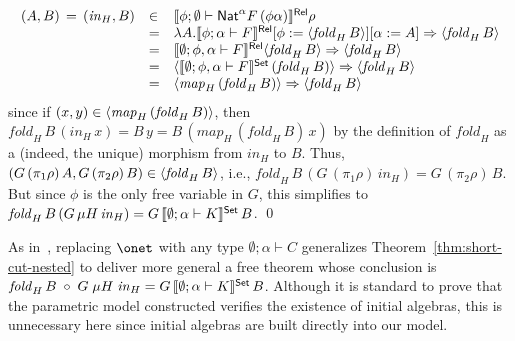 \documentclass{lmcs}
\theoremstyle{plain}\newtheorem{satz}[thm]{Satz}
\begin{document}
\[\begin{array}{lll}
(A,B) \,=\, (\mathit{in}_H,B) & \in & \llbracket{\phi;\emptyset\vdash
  \mathsf{Nat}^\alpha F\, (\phi\alpha)}\rrbracket^{\mathsf{Rel}}\rho\\
& = & \lambda A. \llbracket{\phi;\alpha\vdash F}\rrbracket^{\mathsf{Rel}}[\phi :=
  \langle {\mathit{fold}_H\, B} \rangle][\alpha := A] \Rightarrow 
 \langle {\mathit{fold}_H\, B} \rangle \\ 
& = & \llbracket{\emptyset;\phi,\alpha\vdash F}\rrbracket^{\mathsf{Rel}}
  \langle {\mathit{fold}_H\, B} \rangle \Rightarrow \langle {\mathit{fold}_H\,
    B} \rangle\\
  & = & \langle {\llbracket{\emptyset;\phi,\alpha\vdash F}\rrbracket^{\mathsf{Set}}
    \,(\mathit{fold}_H\,B)} \rangle \Rightarrow \langle {\mathit{fold}_H\, B} \rangle\\
  & = & \langle {\mathit{map}_H \,(\mathit{fold}_H\,B)} \rangle \Rightarrow
\langle {\mathit{fold}_H\, B} \rangle\\
\end{array}\]
since if $(x,y) \in \langle {\mathit{map}_H \,(\mathit{fold}_H\,B)} \rangle$,
then $\mathit{fold}_H\, B\, (\mathit{in}_H\,x) = B\,y = B\,
(\mathit{map}_H \,(\mathit{fold}_H\,B) \, x)$ by the definition of
$\mathit{fold}_H$ as a (indeed, the unique) morphism from
$\mathit{in}_H$ to $B$.  Thus, $(G \,(\pi_1 \rho)\, A, G\, (\pi_2
\rho)\, B) \in \langle {\mathit{fold}_H\, B} \rangle$, i.e., $\mathit{fold}_H \,
B \, (G\, (\pi_1 \rho) \, \mathit{in}_H) = G\,(\pi_2 \rho)\,B$.  But
since $\phi$ is the only free variable in $G$, this simplifies to
$\mathit{fold}_H\, B \, (G\, \mu H\, \mathit{in}_H) =
G\,\llbracket{\emptyset;\alpha\vdash K}\rrbracket^{\mathsf{Set}}\,B$. 
\qed

\vspace*{-0.08in}

As in~\cite{jg10}, replacing $\onet$ with any type $\emptyset;\alpha
\vdash C$ generalizes
Theorem~\ref{thm:short-cut-nested} to deliver more general a free
theorem whose conclusion is $\mathit{fold}_{H}\, B \; \circ \; G\; \mu
H \; \mathit{in}_{H} = G \,\llbracket{\emptyset;\alpha \vdash K}\rrbracket^{\mathsf{Set}}\, B$.
Although it is standard to prove that the parametric model constructed
verifies the existence of initial algebras, this is unnecessary here
since initial algebras are built directly into our model.
\end{document}
